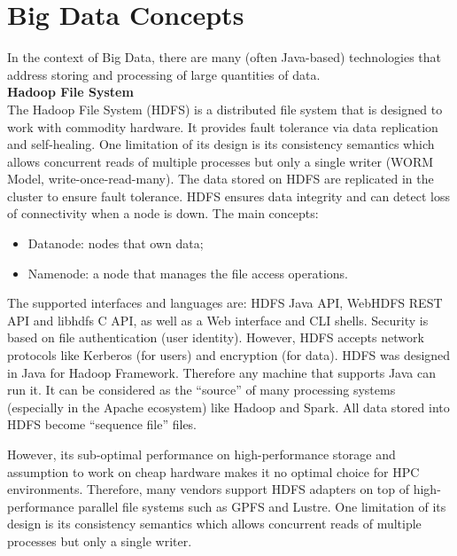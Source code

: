 \section{Big Data Concepts}

In the context of Big Data, there are many (often Java-based) technologies that address storing and processing of large quantities of data. \\

\textbf{Hadoop File System}\\
The Hadoop File System (HDFS) is a distributed file system that is designed to work with commodity hardware.
It provides fault tolerance via data replication and self-healing.
One limitation of its design is its consistency semantics which allows concurrent reads of multiple processes but only a single writer (WORM Model, write-once-read-many).
The data stored on HDFS are replicated in the cluster to ensure fault tolerance.
HDFS ensures data integrity and can detect loss of connectivity when a node is down.
The main concepts:

\begin{itemize}
	\item Datanode: nodes that own data;
	\item Namenode: a node that manages the file access operations.
\end{itemize}

The supported interfaces and languages are: HDFS Java API, WebHDFS REST API and libhdfs C API, as well as a Web interface and CLI shells.
Security is based on file authentication (user identity). However, HDFS accepts network protocols like Kerberos (for users) and encryption (for data).
HDFS was designed in Java for Hadoop Framework. Therefore any machine that supports Java can run it.
It can be considered as the ``source'' of many processing systems (especially in the Apache ecosystem) like Hadoop and Spark. All data stored into HDFS become ``sequence file'' files.

However, its sub-optimal performance on high-performance storage and assumption to work on cheap hardware makes it no optimal choice for HPC environments.
Therefore, many vendors support HDFS adapters on top of high-performance parallel file systems such as GPFS and Lustre.
One limitation of its design is its consistency semantics which allows concurrent reads of multiple processes but only a single writer.
\\


